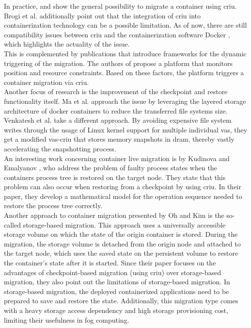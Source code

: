 In practice, \cite{Brogi.2018} and \cite{Oh.2018} show the general possibility to migrate a container using \gls{criu}. Brogi et al. \cite{Brogi.2018} additionally point out that the integration of \gls{criu} into containerization technology can be a possible limitation. As of now, there are still compatibility issues between \gls{criu} and the containerization software Docker \cite{.27032020}, which highlights the actuality of the issue.\\
This is complemented by publications that introduce frameworks for the dynamic triggering of the migration. The authors of \cite{Puliafito.2018} propose a platform that monitors position and resource constraints. Based on these factors, the platform triggers a container migration via \gls{criu}.\\
Another focus of research is the improvement of the checkpoint and restore functionality itself. Ma et al. \cite{Ma.2019} approach the issue by leveraging the layered storage architecture of docker containers to reduce the transferred file systems size. Venkatesh et al. \cite{Venkatesh.2019} take a different approach. By avoiding expensive file system writes through the usage of Linux kernel support for multiple individual \gls{vas}, they get a modified \gls{vas}-\gls{criu} that stores memory snapshots in \gls{dram}, thereby vastly accelerating the snapshotting process.\\
An interesting work concerning container live migration is by Kudinova and Emalyanov \cite{Kudinova.2017}, who address the problem of faulty process states when the containers process tree is restored on the target node. They state that this problem can also occur when restoring from a checkpoint by using \gls{criu}. In their paper, they develop a mathematical model for the operation sequence needed to restore the process tree correctly.\\
Another approach to container migration presented by Oh and Kim \cite{Oh.2018} is the so-called storage-based migration. This approach uses a universally accessible storage volume on which the state of the origin container is stored. During the migration, the storage volume is detached from the origin node and attached to the target node, which uses the saved state on the persistent volume to restore the container's state after it is started. Since their paper focuses on the advantages of checkpoint-based migration (using \gls{criu}) over storage-based migration, they also point out the limitations of storage-based migration. In storage-based migration, the deployed containerized applications need to be prepared to save and restore the state. Additionally, this migration type comes with a heavy storage access dependency and high storage provisioning cost, limiting their usefulness in fog computing.


